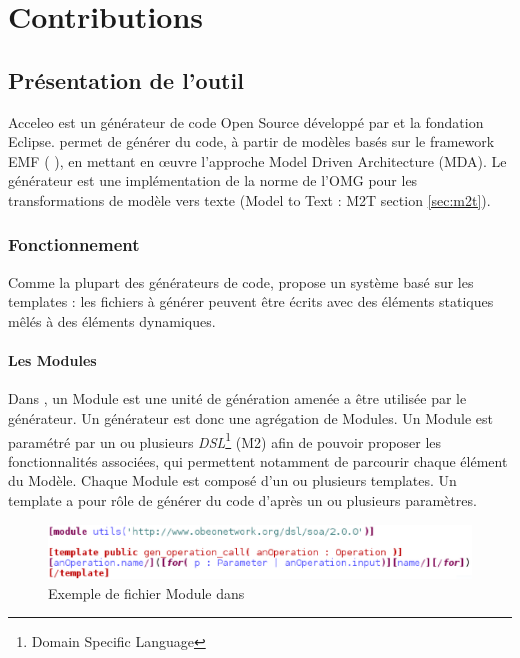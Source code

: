 \chapter{Contributions}\label{chap:tra}

\section{Présentation de l'outil \kwacceleo{}}\label{sec:acc}

Acceleo est un générateur de code Open Source développé par \kwobeo{} et la fondation Eclipse. \kwacceleo{} permet de générer du code, à partir de modèles basés sur le framework EMF (\cf{} \cite{emf}), en mettant en œuvre l'approche Model Driven Architecture (MDA). Le générateur \kwacceleo{} est une implémentation de la norme de l'OMG pour les transformations de modèle vers texte (Model to Text : M2T \cf{} section \ref{sec:m2t}).

\subsection{Fonctionnement}

Comme la plupart des générateurs de code, \kwacceleo{} propose un système basé sur les templates : les fichiers à générer peuvent être écrits avec des éléments statiques mêlés à des éléments dynamiques.

\subsubsection{Les Modules}

Dans \kwacceleo{}, un Module est une unité de génération amenée a être utilisée par le générateur. Un générateur est donc une agrégation de Modules. Un Module est paramétré par un ou plusieurs \textit{DSL}\footnote{Domain Specific Language} (M2) afin de pouvoir proposer les fonctionnalités associées, qui permettent notamment de parcourir chaque élément du Modèle. Chaque Module est composé d'un ou plusieurs templates. Un template a pour rôle de générer du code d'après un ou plusieurs paramètres.

\begin{figure}[htb]
  \centering
  \includegraphics[scale=0.6]{img/screen_template.eps}
  \caption{Exemple de fichier Module dans \kwacceleo{}}
  \label{fig:acc_module}
\end{figure}


